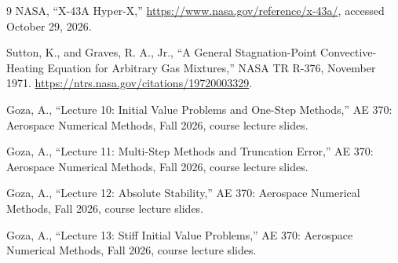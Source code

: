 \documentclass[conf]{new-aiaa}
\begin{document}
\begin{thebibliography}{9}
NASA, ``X-43A Hyper-X,''
\url{https://www.nasa.gov/reference/x-43a/}, accessed October 29, 2026.

Sutton, K., and Graves, R. A., Jr.,
``A General Stagnation-Point Convective-Heating Equation for Arbitrary Gas Mixtures,''
NASA TR R-376, November 1971.
\url{https://ntrs.nasa.gov/citations/19720003329}.


Goza, A., ``Lecture 10: Initial Value Problems and One-Step Methods,''
AE 370: Aerospace Numerical Methods, Fall 2026, course lecture slides.

Goza, A., ``Lecture 11: Multi-Step Methods and Truncation Error,''
AE 370: Aerospace Numerical Methods, Fall 2026, course lecture slides.

Goza, A., ``Lecture 12: Absolute Stability,''
AE 370: Aerospace Numerical Methods, Fall 2026, course lecture slides.

Goza, A., ``Lecture 13: Stiff Initial Value Problems,''
AE 370: Aerospace Numerical Methods, Fall 2026, course lecture slides.
\end{thebibliography}
\end{document}
